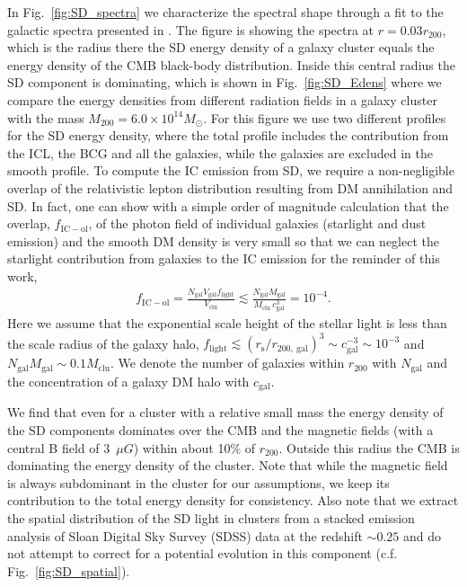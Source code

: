 \documentclass[10pt,aps,pra,reprint,amsmath,amsfonts,amssymb,showpacs,nofootinbib,floatfix]{revtex4-1}
\newcommand{\rmn}{\mathrm}
\newcommand{\msun}{M_\odot}
\newcommand{\rvir}{r_{200}}
\newcommand{\mvir}{M_{200}}
\begin{document}
In Fig.~\ref{fig:SD_spectra} we characterize the spectral shape
through a fit to the galactic spectra presented in
\cite{2006ApJ...648L..29P}.  The figure is showing the spectra at
$r=0.03\rvir$, which is the radius there the SD energy density of a
galaxy cluster equals the energy density of the CMB black-body
distribution. Inside this central radius the SD component is
dominating, which is shown in Fig.~\ref{fig:SD_Edens} where we compare
the energy densities from different radiation fields in a galaxy
cluster with the mass $\mvir=6.0\times10^{14}\msun$. For this figure we
use two different profiles for the SD energy density, where the total
profile includes the contribution from the ICL, the BCG and all the
galaxies, while the galaxies are excluded in the smooth profile. To
compute the IC emission from SD, we require a non-negligible overlap
of the relativistic lepton distribution resulting from DM annihilation
and SD.  In fact, one can show with a simple order of magnitude
calculation that the overlap, $f_\rmn{IC-ol}$, of the photon field of
individual galaxies (starlight and dust emission) and the smooth DM
density is very small so that we can neglect the starlight
contribution from galaxies to the IC emission for the reminder of this
work,
\begin{eqnarray}
\label{eq:SD_overlap}
f_\rmn{IC-ol} = \frac{N_\rmn{gal} V_\rmn{gal} f_\rmn{light}}{V_\rmn{clu}}
\lesssim  \frac{N_\rmn{gal} M_\rmn{gal}}{M_\rmn{clu}\,c_\rmn{gal}^{3}}=10^{-4}.
\end{eqnarray}
Here we assume that the exponential scale height of the stellar light
is less than the scale radius of the galaxy halo, $f_\rmn{light}
\lesssim (r_\rmn{s} / r_{200,~\rmn{gal}})^3 \sim c_\rmn{gal}^{-3} \sim
10^{-3}$ and $N_\rmn{gal} M_\rmn{gal} \sim 0.1 M_\rmn{clu}$. We denote
the number of galaxies within $\rvir$ with $N_\rmn{gal}$ and the
concentration of a galaxy DM halo with $c_\rmn{gal}$.

We find that even for a cluster with a relative small mass the energy
density of the SD components dominates over the CMB and the magnetic
fields (with a central B field of 3~$\mu G$) within about 10\% of
$\rvir$. Outside this radius the CMB is dominating the energy density
of the cluster.  Note that while the magnetic field is always
subdominant in the cluster for our assumptions, we keep its
contribution to the total energy density for consistency. Also note
that we extract the spatial distribution of the SD light in clusters
from a stacked emission analysis of Sloan Digital Sky Survey (SDSS)
data at the redshift $\sim 0.25$ \cite{2005MNRAS.358..949Z} and do not
attempt to correct for a potential evolution in this component
(c.f. Fig.~\ref{fig:SD_spatial}).
\end{document}

